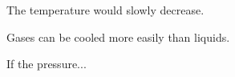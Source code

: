 The temperature would slowly decrease.  

Gases can be cooled more easily than liquids.  

If the pressure...